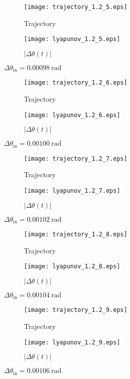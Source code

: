 \documentclass[a4paper]{article}
\begin{document}
	\newpage
	\begin{figure}[H]
		\centering
		\begin{subfigure}{0.85\textwidth}
		\texttt{[image: trajectory\_1.2\_5.eps]}
		\caption{Trajectory}	
		\end{subfigure}
		\begin{subfigure}{0.85\textwidth}
		\texttt{[image: lyapunov\_1.2\_5.eps]}
		\caption{$|\Delta\theta(t)|$}	
		\end{subfigure}
		\caption{$\Delta\theta_{\mathrm{in}} = 0.00098\mathrm{~rad}$}
	\end{figure}
	\newpage
	\begin{figure}[H]
		\centering
		\begin{subfigure}{0.85\textwidth}
		\texttt{[image: trajectory\_1.2\_6.eps]}
		\caption{Trajectory}	
		\end{subfigure}
		\begin{subfigure}{0.85\textwidth}
		\texttt{[image: lyapunov\_1.2\_6.eps]}
		\caption{$|\Delta\theta(t)|$}	
		\end{subfigure}
		\caption{$\Delta\theta_{\mathrm{in}} = 0.00100\mathrm{~rad}$}
	\end{figure}
	\newpage
	\begin{figure}[H]
		\centering
		\begin{subfigure}{0.85\textwidth}
		\texttt{[image: trajectory\_1.2\_7.eps]}
		\caption{Trajectory}	
		\end{subfigure}
		\begin{subfigure}{0.85\textwidth}
		\texttt{[image: lyapunov\_1.2\_7.eps]}
		\caption{$|\Delta\theta(t)|$}	
		\end{subfigure}
		\caption{$\Delta\theta_{\mathrm{in}} = 0.00102\mathrm{~rad}$}
	\end{figure}
	\newpage
	\begin{figure}[H]
		\centering
		\begin{subfigure}{0.85\textwidth}
		\texttt{[image: trajectory\_1.2\_8.eps]}
		\caption{Trajectory}	
		\end{subfigure}
		\begin{subfigure}{0.85\textwidth}
		\texttt{[image: lyapunov\_1.2\_8.eps]}
		\caption{$|\Delta\theta(t)|$}	
		\end{subfigure}
		\caption{$\Delta\theta_{\mathrm{in}} = 0.00104\mathrm{~rad}$}
	\end{figure}
	\newpage
	\begin{figure}[H]
		\centering
		\begin{subfigure}{0.85\textwidth}
		\texttt{[image: trajectory\_1.2\_9.eps]}
		\caption{Trajectory}	
		\end{subfigure}
		\begin{subfigure}{0.85\textwidth}
		\texttt{[image: lyapunov\_1.2\_9.eps]}
		\caption{$|\Delta\theta(t)|$}	
		\end{subfigure}
		\caption{$\Delta\theta_{\mathrm{in}} = 0.00106\mathrm{~rad}$}
	\end{figure}
\end{document}
